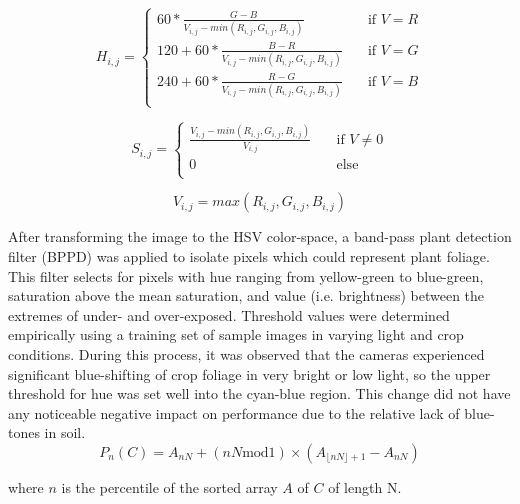 \documentclass[authoryear]{elsarticle}
\begin{document}
\begin{equation}
  H_{i,j} =
  \begin{cases}
    60 * \frac{G-B}{V_{i,j}-min(R_{i,j},G_{i,j},B_{i,j})} & \quad \text{if } V = R \\
    120 + 60 * \frac{B-R}{V_{i,j}-min(R_{i,j},G_{i,j},B_{i,j})} & \quad \text{if } V = G \\
    240 + 60 * \frac{R-G}{V_{i,j}-min(R_{i,j},G_{i,j},B_{i,j})} & \quad \text{if } V = B \\
  \end{cases}
  \label{eq:rgb2h}
\end{equation}

\begin{equation}
  S_{i,j} = 
  \begin{cases}
    \frac{V_{i,j}-min(R_{i,j},G_{i,j},B_{i,j})}{V_{i,j}}  & \quad \text{if } V \neq 0 \\
    0  & \quad \text{else}\\
  \end{cases}
  \label{eq:rgb2s}
\end{equation}

\begin{equation}
  V_{i,j} = max(R_{i,j},G_{i,j},B_{i,j})
  \label{eq:rgb2v}
\end{equation}

After transforming the image to the HSV color-space, a band-pass plant
detection filter (BPPD) was applied to isolate pixels which could
represent plant foliage. This filter selects for pixels with hue
ranging from yellow-green to blue-green, saturation above the mean
saturation, and value (i.e. brightness) between the extremes of under-
and over-exposed. Threshold values were determined empirically using a
training set of sample images in varying light and crop
conditions. During this process, it was observed that the cameras
experienced significant blue-shifting of crop foliage in very bright
or low light, so the upper threshold for hue was set well into the
cyan-blue region. This change did not have any noticeable negative
impact on performance due to the relative lack of blue-tones in soil.
\begin{equation}
  P_{n}(C) = A_{nN} + (nN \text{mod} 1) \times (A_{\lfloor nN \rfloor + 1}-A_{nN})
  \label{eq:percentile}
\end{equation}
\begin{flushleft}
where $n$ is the percentile of the  sorted array $A$ of $C$ of length N.
\end{flushleft}
\end{document}
